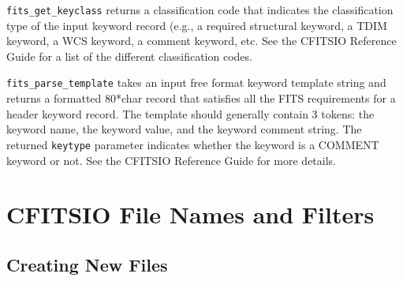\documentclass[11pt]{article}
\begin{document}
{\tt fits\_get\_keyclass} returns a classification code that indicates
the classification type of the input keyword record (e.g., a required
structural keyword, a TDIM keyword, a WCS keyword, a comment keyword,
etc.  See the CFITSIO Reference Guide for a list of the different
classification codes.

{\tt fits\_parse\_template} takes an input free format keyword template
string and returns a formatted 80*char record that satisfies all the
FITS requirements for a header keyword record.  The template should
generally contain 3 tokens: the keyword name, the keyword value, and
the keyword comment string.  The returned {\tt keytype} parameter
indicates whether the keyword is a COMMENT keyword or not.   See the
CFITSIO Reference Guide for more details.

\newpage
\section{CFITSIO File Names and Filters}

\subsection{Creating New Files}
\end{document}
